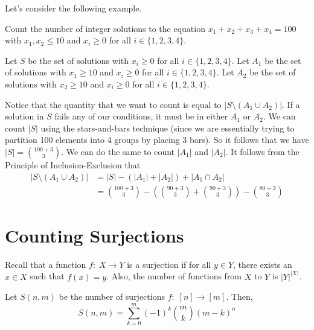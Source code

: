 Let's consider the following example.

\begin{example}
    Count the number of integer solutions to the equation $x_1 + x_2 + x_3 + x_4 = 100$ with $x_1, x_2 \leq 10$ and $x_i \geq 0$ for all $i \in \{1,2,3,4\}$.

    Let $S$ be the set of solutions with $x_i \geq 0$ for all $i \in \{1,2,3,4\}$. Let $A_1$ be the set of solutions with $x_1 \geq 10$ and $x_i \geq 0$ for all $i \in \{1,2,3,4\}$. Let $A_2$ be the set of solutions with $x_2 \geq 10$ and $x_i \geq 0$ for all $i \in \{1,2,3,4\}$.

    Notice that the quantity that we want to count is equal to $|S \setminus (A_1 \cup A_2)|$. If a solution in $S$ fails any of our conditions, it must be in either $A_1$ or $A_2$. We can count $|S|$ using the stars-and-bars technique (since we are essentially trying to partition 100 elements into 4 groups by placing 3 bars). So it follows that we have $|S| = \binom{100+3}{3}$. We can do the same to count $|A_1|$ and $|A_2|$. It follows from the Principle of Inclusion-Exclusion that
    $$
    \begin{aligned}
        |S \setminus (A_1 \cup A_2)| &= |S| - (|A_1|+|A_2|) + |A_1 \cap A_2| \\
        &= \binom{100+3}{3} - \left( \binom{90+3}{3} + \binom{90+3}{3} \right) - \binom{80 + 3}{3}
    \end{aligned}
    $$
\end{example}

\section{Counting Surjections}

Recall that a function $f:\; X \to Y$ is a surjection if for all $y \in Y$, there exists an $x \in X$ such that $f(x) = y$. Also, the number of functions from $X$ to $Y$ is $|Y|^{|X|}$.

\begin{theorem}
    Let $S(n,m)$ be the number of surjections $f:\; [n] \to [m]$. Then,
    $$
    S(n,m) = \sum_{k=0}^m (-1)^k \binom{m}{k} (m-k)^n
    $$
\end{theorem}

